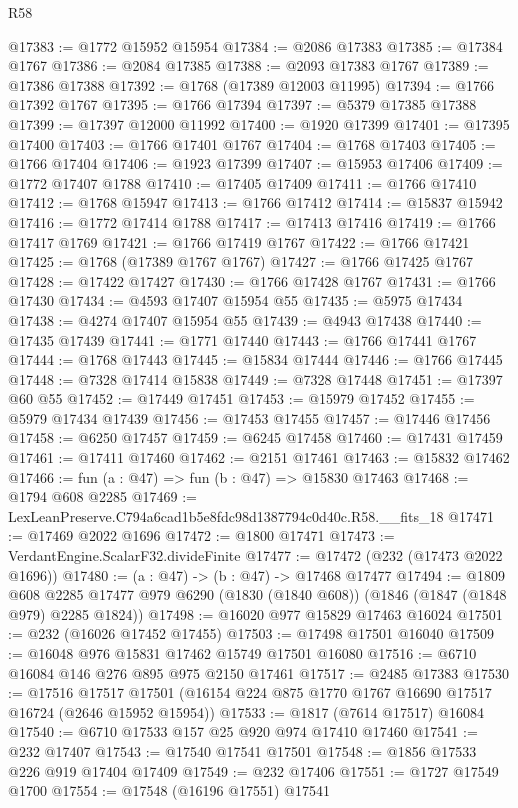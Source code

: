 \begin{lexlean}{R58}
\begin{coremodule}
@17383 := @1772 @15952 @15954
@17384 := @2086 @17383
@17385 := @17384 @1767
@17386 := @2084 @17385
@17388 := @2093 @17383 @1767
@17389 := @17386 @17388
@17392 := @1768 (@17389 @12003 @11995)
@17394 := @1766 @17392 @1767
@17395 := @1766 @17394
@17397 := @5379 @17385 @17388
@17399 := @17397 @12000 @11992
@17400 := @1920 @17399
@17401 := @17395 @17400
@17403 := @1766 @17401 @1767
@17404 := @1768 @17403
@17405 := @1766 @17404
@17406 := @1923 @17399
@17407 := @15953 @17406
@17409 := @1772 @17407 @1788
@17410 := @17405 @17409
@17411 := @1766 @17410
@17412 := @1768 @15947
@17413 := @1766 @17412
@17414 := @15837 @15942
@17416 := @1772 @17414 @1788
@17417 := @17413 @17416
@17419 := @1766 @17417 @1769
@17421 := @1766 @17419 @1767
@17422 := @1766 @17421
@17425 := @1768 (@17389 @1767 @1767)
@17427 := @1766 @17425 @1767
@17428 := @17422 @17427
@17430 := @1766 @17428 @1767
@17431 := @1766 @17430
@17434 := @4593 @17407 @15954 @55
@17435 := @5975 @17434
@17438 := @4274 @17407 @15954 @55
@17439 := @4943 @17438
@17440 := @17435 @17439
@17441 := @1771 @17440
@17443 := @1766 @17441 @1767
@17444 := @1768 @17443
@17445 := @15834 @17444
@17446 := @1766 @17445
@17448 := @7328 @17414 @15838
@17449 := @7328 @17448
@17451 := @17397 @60 @55
@17452 := @17449 @17451
@17453 := @15979 @17452
@17455 := @5979 @17434 @17439
@17456 := @17453 @17455
@17457 := @17446 @17456
@17458 := @6250 @17457
@17459 := @6245 @17458
@17460 := @17431 @17459
@17461 := @17411 @17460
@17462 := @2151 @17461
@17463 := @15832 @17462
@17466 := fun (a : @47) => fun (b : @47) => @15830 @17463
@17468 := @1794 @608 @2285
@17469 := LexLeanPreserve.C794a6cad1b5e8fdc98d1387794c0d40c.R58.__fits_18
@17471 := @17469 @2022 @1696
@17472 := @1800 @17471
@17473 := VerdantEngine.ScalarF32.divideFinite
@17477 := @17472 (@232 (@17473 @2022 @1696))
@17480 := (a : @47) -> (b : @47) -> @17468 @17477
@17494 := @1809
    @608
    @2285
    @17477
    @979
    @6290
    (@1830 (@1840 @608))
    (@1846 (@1847 (@1848 @979) @2285 @1824))
@17498 := @16020 @977 @15829 @17463 @16024
@17501 := @232 (@16026 @17452 @17455)
@17503 := @17498 @17501 @16040
@17509 := @16048 @976 @15831 @17462 @15749 @17501 @16080
@17516 := @6710 @16084 @146 @276 @895 @975 @2150 @17461
@17517 := @2485 @17383
@17530 := @17516
    @17517
    @17501
    (@16154 @224 @875 @1770 @1767 @16690 @17517 @16724 (@2646 @15952 @15954))
@17533 := @1817 (@7614 @17517) @16084
@17540 := @6710 @17533 @157 @25 @920 @974 @17410 @17460
@17541 := @232 @17407
@17543 := @17540 @17541 @17501
@17548 := @1856 @17533 @226 @919 @17404 @17409
@17549 := @232 @17406
@17551 := @1727 @17549 @1700
@17554 := @17548 (@16196 @17551) @17541

\end{coremodule}
\end{lexlean}
